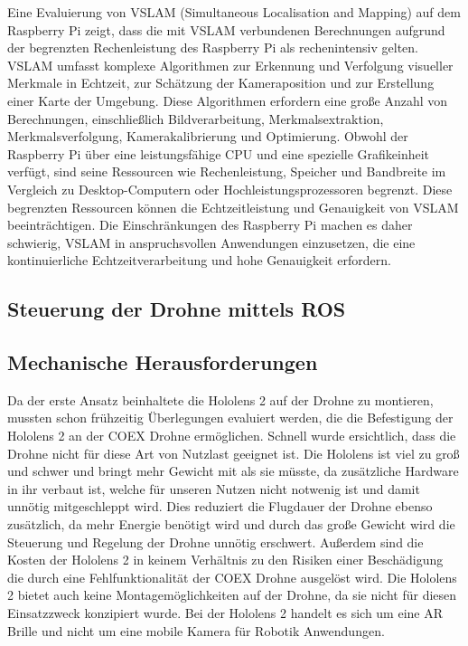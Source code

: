 Eine Evaluierung von \ac{VSLAM} (Simultaneous Localisation and Mapping) auf dem Raspberry Pi zeigt, dass die mit \ac{VSLAM} verbundenen Berechnungen aufgrund der begrenzten Rechenleistung des Raspberry Pi als rechenintensiv gelten. \ac{VSLAM} umfasst komplexe Algorithmen zur Erkennung und Verfolgung visueller Merkmale in Echtzeit, zur Schätzung der Kameraposition und zur Erstellung einer Karte der Umgebung. Diese Algorithmen erfordern eine große Anzahl von Berechnungen, einschließlich Bildverarbeitung, Merkmalsextraktion, Merkmalsverfolgung, Kamerakalibrierung und Optimierung. Obwohl der Raspberry Pi über eine leistungsfähige CPU und eine spezielle Grafikeinheit verfügt, sind seine Ressourcen wie Rechenleistung, Speicher und Bandbreite im Vergleich zu Desktop-Computern oder Hochleistungsprozessoren begrenzt. Diese begrenzten Ressourcen können die Echtzeitleistung und Genauigkeit von \ac{VSLAM} beeinträchtigen. Die Einschränkungen des Raspberry Pi machen es daher schwierig, \ac{VSLAM} in anspruchsvollen Anwendungen einzusetzen, die eine kontinuierliche Echtzeitverarbeitung und hohe Genauigkeit erfordern.

\subsection{Steuerung der Drohne mittels ROS}\label{steuerung_drohne_ros:subsection}

\subsection{Mechanische Herausforderungen}\label{mechanische-herausforderungen:section}

Da der erste Ansatz beinhaltete die Hololens 2 auf der Drohne zu montieren, mussten schon frühzeitig Überlegungen evaluiert werden, die die Befestigung der Hololens 2 an der COEX Drohne ermöglichen. Schnell wurde ersichtlich, dass die Drohne nicht für diese Art von Nutzlast geeignet ist. Die Hololens ist viel zu groß und schwer und bringt mehr Gewicht mit als sie müsste, da zusätzliche Hardware in ihr verbaut ist, welche für unseren Nutzen nicht notwenig ist und damit unnötig mitgeschleppt wird. Dies reduziert die Flugdauer der Drohne ebenso zusätzlich, da mehr Energie benötigt wird und durch das große Gewicht wird die Steuerung und Regelung der Drohne unnötig erschwert. Außerdem sind die Kosten der Hololens 2 in keinem Verhältnis zu den Risiken einer Beschädigung die durch eine Fehlfunktionalität der COEX Drohne ausgelöst wird. Die Hololens 2 bietet auch keine Montagemöglichkeiten auf der Drohne, da sie nicht für diesen Einsatzzweck konzipiert wurde. Bei der Hololens 2 handelt es sich um eine \ac{AR} Brille und nicht um eine mobile Kamera für Robotik Anwendungen.


